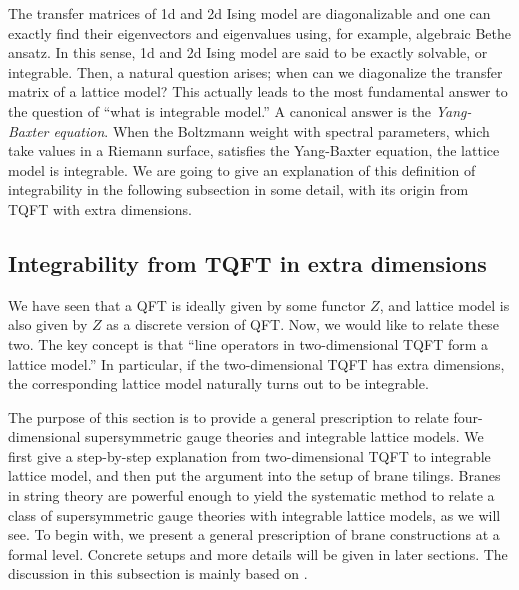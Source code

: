 The transfer matrices of 1d and 2d Ising model are diagonalizable
and one can exactly find their eigenvectors and eigenvalues using,
for example, algebraic Bethe ansatz. In this sense, 1d and 2d Ising
model are said to be exactly solvable, or integrable. Then, a natural
question arises; when can we diagonalize the transfer matrix of a
lattice model? This actually leads to the most fundamental answer
to the question of ``what is integrable model.'' A canonical answer
is the \emph{Yang-Baxter equation}. When the Boltzmann weight with spectral
parameters, which take values in a Riemann surface, satisfies the
Yang-Baxter equation, the lattice model is integrable. We are going to give
an explanation of this definition of integrability in the following subsection
in some detail, with its origin from TQFT with extra dimensions.







\subsection{Integrability from TQFT in extra dimensions}
\label{sec:integrability_from_TQFT}

We have seen that a QFT is ideally given by some functor $Z$, and
lattice model is also given by $Z$ as a discrete version of QFT.
Now, we would like to relate these two. The key concept is that
``line operators in two-dimensional TQFT form a lattice model.''
In particular, if the two-dimensional TQFT has extra dimensions, the corresponding
lattice model naturally turns out to be integrable.


The purpose of this section is to provide a general prescription to relate four-dimensional
supersymmetric gauge theories and integrable lattice models.
We first give a step-by-step
explanation from two-dimensional TQFT to integrable lattice model,
and then put the argument into the setup of brane tilings. Branes in
string theory are powerful enough to yield the systematic method to
relate a class of supersymmetric gauge theories with integrable lattice
models, as we will see. To begin with, we present a general prescription
of brane constructions at a formal level. Concrete setups and more
details will be given in later sections.
The discussion in this subsection is mainly based on \cite{Yagi:2015lha}.







